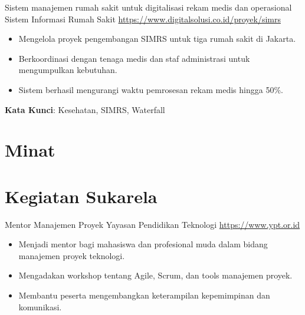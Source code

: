 \documentclass[a4paper, serif, 10pt]{moderncv}
\begin{document}
        {Sistem manajemen rumah sakit untuk digitalisasi rekam medis dan operasional}
        {Sistem Informasi Rumah Sakit}
        {\url{https://www.digitalsolusi.co.id/proyek/simrs}}
        {}
        {\begin{itemize}
\item Mengelola proyek pengembangan SIMRS untuk tiga rumah sakit di Jakarta.
\item Berkoordinasi dengan tenaga medis dan staf administrasi untuk mengumpulkan kebutuhan.
\item Sistem berhasil mengurangi waktu pemrosesan rekam medis hingga 50\%.
\end{itemize}
\textbf{Kata Kunci}: Kesehatan, SIMRS, Waterfall}
\section{Minat}

\section{Kegiatan Sukarela}

        {Mentor Manajemen Proyek}
        {Yayasan Pendidikan Teknologi}
        {\url{https://www.ypt.or.id}}
        {}
        {\begin{itemize}
\item Menjadi mentor bagi mahasiswa dan profesional muda dalam bidang manajemen proyek teknologi.
\item Mengadakan workshop tentang Agile, Scrum, dan tools manajemen proyek.
\item Membantu peserta mengembangkan keterampilan kepemimpinan dan komunikasi.
\end{itemize}}
    
\end{document}
